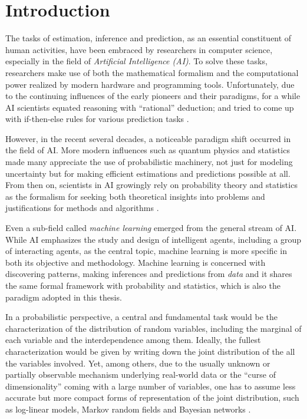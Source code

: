 
\chapter{Introduction}
The tasks of estimation, inference and prediction, as an essential constituent of human activities, have been embraced by researchers in computer science, especially in the field of \textit{Artificial Intelligence (AI)}. 
To solve these tasks, researchers make use of both the mathematical formalism and the computational power realized by modern hardware and programming tools. 
Unfortunately, due to the continuing influences of the early pioneers and their paradigms, for a while AI scientists equated reasoning with ``rational'' deduction; and tried to come up with if-then-else rules for various prediction tasks \cite{ravikumar2007}.

However, in the recent several decades, a noticeable paradigm shift occurred in the field of AI. 
More modern influences such as quantum physics and statistics made many appreciate the use of probabilistic machinery, not just for modeling uncertainty but for making efficient estimations and predictions possible at all. From then on, scientists in AI growingly rely on probability theory and statistics as the formalism for seeking both theoretical insights into problems and justifications for methods and algorithms \cite{russell2010book}. 

Even a sub-field called \textit{machine learning} emerged from the general stream of AI. 
While AI emphasizes the study and design of intelligent agents, including  a group of interacting agents, as the central topic, machine learning is more specific in both its objective and methodology. Machine learning is concerned with discovering patterns, making inferences and predictions from \textit{data} and it shares the same formal framework with probability and statistics, which is also the paradigm adopted in this thesis.

In a probabilistic perspective, a central and fundamental task would be the characterization of the distribution of random variables, including the marginal of each variable and the interdependence among them. Ideally, the fullest characterization would be given by writing down the joint distribution of the all the variables involved. Yet, among others, due to the usually unknown or partially observable mechanism underlying real-world data or the ``curse of dimensionality'' coming with a large number of variables, one has to assume less accurate but more compact forms of representation of the joint distribution, such as log-linear models, Markov random fields and Bayesian networks \cite{bishop2006prml}.


